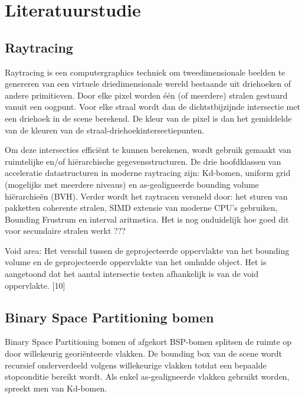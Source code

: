 \chapter{Literatuurstudie}
\label{hoofdstuk:literature}

\section{Raytracing}
Raytracing is een computergraphics techniek om tweedimensionale beelden te genereren van een virtuele driedimensionale wereld bestaande uit driehoeken of andere primitieven.
Door elke pixel worden één (of meerdere) stralen gestuurd vanuit een oogpunt.
Voor elke straal wordt dan de dichtstbijzijnde intersectie met een driehoek in de scene berekend.
De kleur van de pixel is dan het gemiddelde van de kleuren van de straal-driehoekintersectiepunten.

Om deze intersecties efficiënt te kunnen berekenen, wordt gebruik gemaakt van ruimtelijke en/of hiërarchische gegevensstructuren.
De drie hoofdklassen van acceleratie datastructuren in moderne raytracing zijn: Kd-bomen, uniform grid (mogelijks met meerdere niveaus) en as-gealigneerde bounding volume hiërarchieën (BVH). 
Verder wordt het raytracen versneld door: het sturen van pakketten coherente stralen, SIMD extensie van moderne CPU's gebruiken, Bounding Frustrum en interval aritmetica.
Het is nog onduidelijk hoe goed dit voor secundaire stralen werkt ???

Void area: Het verschil tussen de geprojecteerde oppervlakte van het bounding volume en de geprojecteerde oppervlakte van het omhulde object.
Het is aangetoond dat het aantal intersectie testen afhankelijk is van de void oppervlakte. [10]

\section{Binary Space Partitioning bomen}
Binary Space Partitioning bomen of afgekort BSP-bomen splitsen de ruimte op door willekeurig georiënteerde vlakken.
De bounding box van de scene wordt recursief onderverdeeld volgens willekeurige vlakken totdat een bepaalde stopconditie bereikt wordt.
Als enkel as-gealigneerde vlakken gebruikt worden, spreekt men van Kd-bomen.


